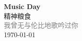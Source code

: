 \vspace*{\fill}
\begin{center}
    \textcolor{orange!50}{\Huge\textbf{Music Day}} \\[1em]
    \textcolor{orange!60!pink}{\Large 精神粮食} \\[2em]
    \textcolor{gray}{\large 我曾无与伦比地歌吟过你} \\[1em]
    \today
\end{center}
\vspace*{\fill}
\clearpage


\clearpage

\clearpage
